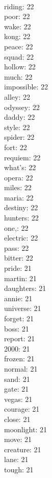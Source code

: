 \begin{multicols}{6}
  \\ riding: 22
  \\ poor: 22
  \\ wake: 22
  \\ kong: 22
  \\ peace: 22
  \\ squad: 22
  \\ hollow: 22
  \\ much: 22
  \\ impossible: 22
  \\ alley: 22
  \\ odyssey: 22
  \\ daddy: 22
  \\ style: 22
  \\ spider: 22
  \\ fort: 22
  \\ requiem: 22
  \\ what's: 22
  \\ opera: 22
  \\ miles: 22
  \\ maria: 22
  \\ destiny: 22
  \\ hunters: 22
  \\ one,: 22
  \\ electric: 22
  \\ pass: 22
  \\ bitter: 22
  \\ pride: 21
  \\ martin: 21
  \\ daughters: 21
  \\ annie: 21
  \\ universe: 21
  \\ forget: 21
  \\ boss: 21
  \\ report: 21
  \\ 2000: 21
  \\ frozen: 21
  \\ normal: 21
  \\ sand: 21
  \\ gate: 21
  \\ vegas: 21
  \\ courage: 21
  \\ close: 21
  \\ moonlight: 21
  \\ move: 21
  \\ creature: 21
  \\ lane: 21
  \\ tough: 21

\end{multicols}
